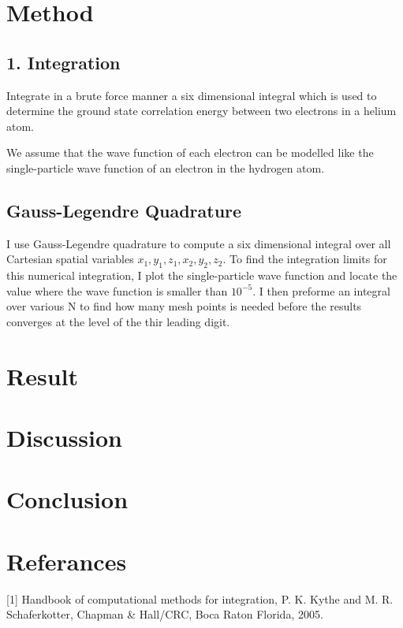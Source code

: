 \documentclass[%
reprint,
amsmath,amssymb,
aps,
]{revtex4-1}
\begin{document}
\section{Method}
\subsection{1. Integration}
Integrate in a brute force manner a six dimensional integral which is used to determine the ground state correlation energy between two electrons in a helium atom. 

We assume that the wave function of each electron can be modelled like the single-particle wave function of an electron in the hydrogen atom. 

\subsection*{Gauss-Legendre Quadrature}
I use Gauss-Legendre quadrature to compute a six dimensional integral over all Cartesian spatial variables $x_1, y_1, z_1, x_2,y_2,z_2$. To find the integration limits for this numerical integration, I plot the single-particle wave function and locate the value where the wave function is smaller than $10^{-5}$. I then preforme an integral over various N to find how many mesh points is needed before the results converges at the level of the thir leading digit. 

\section{Result}
\section{Discussion}
\section{Conclusion }

\section{Referances}
[1] Handbook of computational methods for integration, P. K. Kythe and M. R. Schaferkotter, Chapman \& Hall/CRC, Boca Raton Florida, 2005.
\end{document}
